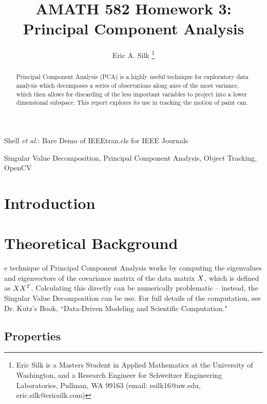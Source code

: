\documentclass[journal]{IEEEtran}
\begin{document}
\title{AMATH 582 Homework 3: Principal Component Analysis}

\author{Eric A. Silk
\thanks{Eric Silk is a Masters Student in Applied Mathematics at the University of Washington,
		and a Research Engineer for Schweitzer Engineering Laboratories, Pullman, WA 99163 (email: esilk16@uw.edu, eric.silk@ericsilk.com)}
}

{Shell \MakeLowercase{\textit{et al.}}: Bare Demo of IEEEtran.cls for IEEE Journals}
\maketitle

\begin{abstract}
Principal Component Analysis (PCA) is a highly useful technique for exploratory data analysis which decomposes a series of observations along axes of the most variance, which then allows for discarding of the less important variables to project into a lower dimensional subspace. This report explores its use in tracking the motion of paint can.
\end{abstract}

\begin{IEEEkeywords}
Singular Value Decomposition, Principal Component Analysis, Object Tracking, OpenCV
\end{IEEEkeywords}


\IEEEpeerreviewmaketitle


\section{Introduction}

\section{Theoretical Background}
e technique of Principal Component Analysis works by computing the eigenvalues and eigenvectors of the covariance matrix of the data matrix $\boldmath{X}$, which is defined as $\boldmath{X}\boldmath{X^T}$. Calculating this directly can be numerically problematic -- instead, the Singular Value Decomposition can be use. For full details of the computation, see Dr. Kutz's Book, ``Data-Driven Modeling and Scientific Computation."


\subsection{Properties}
\end{document}
